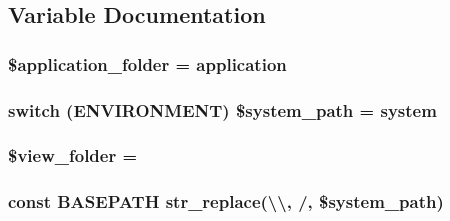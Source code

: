 \subsection{Variable Documentation}
\hypertarget{index_8php_ace4309eda0b92e3260b226079bc17909}{}
\subsubsection[{\$application\+\_\+folder}]{\setlength{\rightskip}{0pt plus 5cm}\$application\+\_\+folder = \textquotesingle{}application\textquotesingle{}}\label{index_8php_ace4309eda0b92e3260b226079bc17909}
\hypertarget{index_8php_af832b0c9a5014f0bb87496701ceb30e5}{}
\subsubsection[{\$system\+\_\+path}]{\setlength{\rightskip}{0pt plus 5cm}switch ({\bf E\+N\+V\+I\+R\+O\+N\+M\+E\+N\+T}) \$system\+\_\+path = \textquotesingle{}system\textquotesingle{}}\label{index_8php_af832b0c9a5014f0bb87496701ceb30e5}
\hypertarget{index_8php_a974fdae9fe36c7e07e82bb71ed42b6b3}{}
\subsubsection[{\$view\+\_\+folder}]{\setlength{\rightskip}{0pt plus 5cm}\$view\+\_\+folder = \textquotesingle{}\textquotesingle{}}\label{index_8php_a974fdae9fe36c7e07e82bb71ed42b6b3}
\hypertarget{index_8php_ad39801cabfd338dc5524466fe793fda9}{}
\subsubsection[{B\+A\+S\+E\+P\+A\+T\+H}]{\setlength{\rightskip}{0pt plus 5cm}const B\+A\+S\+E\+P\+A\+T\+H str\+\_\+replace(\textquotesingle{}\textbackslash{}\textbackslash{}\textquotesingle{}, \textquotesingle{}/\textquotesingle{}, \$system\+\_\+path)}\label{index_8php_ad39801cabfd338dc5524466fe793fda9}
\hypertarget{index_8php_afe05baa2384a370483088b4c250fcd90}{}

